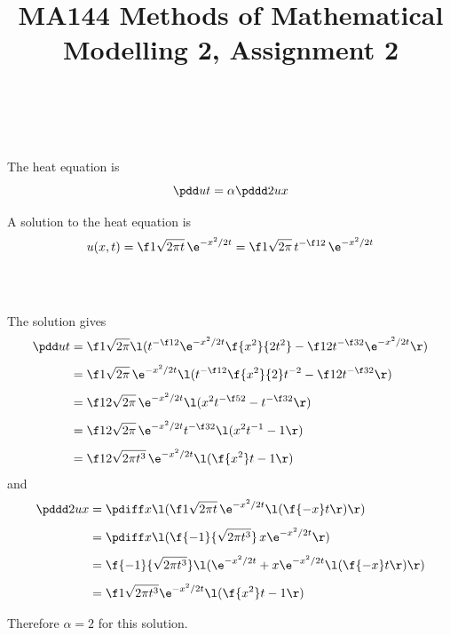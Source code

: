\documentclass[a4paper]{article}
\title{MA144 Methods of Mathematical Modelling 2, Assignment 2}
\begin{document}
\maketitle

\setlength{\parindent}{0em}
\setlength{\parskip}{1em}


\subsection{~}

The heat equation is
$$\pdd ut = \alpha \pddd 2ux$$

A solution to the heat equation is
$$u(x, t) = \f1{\sqrt{2 \pi t}}\, \e^{- x^2 / 2t} = \f1{\sqrt{2\pi}}\, t^{-\f12}\, \e^{- x^2 / 2t}$$

\subsubsection{~}

The solution gives \begin{align*}
\pdd ut &= \f1{\sqrt{2\pi}} \l( t^{-\f12} \e^{-x^2 / 2t} \f{x^2}{2t^2} - \f12 t^{-\f32} \e^{-x^2 / 2t} \r)\\[1ex]
&= \f1{\sqrt{2\pi}}\, \e^{-x^2 / 2t} \l( t^{-\f12} \f{x^2}{2} t^{-2} - \f12 t^{-\f32} \r)\\[1ex]
&= \f1{2\sqrt{2\pi}}\, \e^{-x^2 / 2t} \l( x^2 t^{-\f52} - t^{-\f32} \r)\\[1ex]
&= \f1{2\sqrt{2\pi}}\, \e^{-x^2 / 2t} t^{-\f32} \l( x^2 t^{-1} - 1 \r)\\[1ex]
&= \f1{2\sqrt{2\pi t^3}}\, \e^{-x^2 / 2t} \l( \f{x^2}t - 1 \r)
\end{align*}
and \begin{align*}
\pddd 2ux &= \pdiff x \l( \f1{\sqrt{2\pi t}}\, \e^{-x^2 / 2t} \l( \f{-x}t \r) \r)\\[1ex]
&= \pdiff x \l( \f{-1}{\sqrt{2\pi t^3}}\, x \e^{-x^2 / 2t} \r)\\[1ex]
&= \f{-1}{\sqrt{2\pi t^3}} \l( \e^{-x^2 / 2t} + x \e^{-x^2 / 2t} \l(\f{-x}t\r) \r)\\[1ex]
&= \f1{\sqrt{2\pi t^3}} \e^{-x^2 / 2t} \l( \f{x^2}t - 1 \r)
\end{align*}

Therefore $\alpha = 2$ for this solution.

\subsubsection{~}
\end{document}
